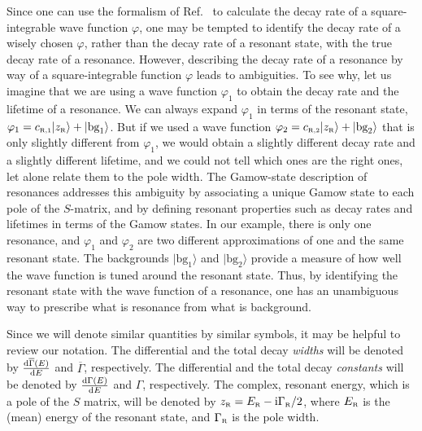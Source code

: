 \documentclass[12pt]{article}
\newcommand{\rmi}{{\rm i}}
\newcommand{\rmd}{{\rm d}}
\newcommand{\zr}{z_{\text{\tiny R}}}
\newcommand{\gr}{\Gamma _{\text{\tiny R}}}
\newcommand{\er}{E_{\text{\tiny R}}}
\newcommand{\Co}{c_{\text{\tiny R,1}}}
\newcommand{\Ct}{c_{\text{\tiny R,2}}}
\begin{document}
Since one can use the formalism of Ref.~\cite{NPA15} to calculate 
the decay rate of a square-integrable wave function $\varphi$, one may be 
tempted to identify the decay rate of a wisely chosen $\varphi$, rather than
the decay rate of a resonant state, with the true decay 
rate of a resonance. However, describing 
the decay rate of a resonance by way of a square-integrable function
$\varphi$ leads to ambiguities. To see why, let us imagine that we are using
a wave function $\varphi _1$ to obtain the decay rate and the
lifetime of a resonance. We
can always expand $\varphi _1$ in terms of the resonant state,
$\varphi _1= \Co |{\zr} \rangle + |\text{bg}_1\rangle$. But if we used 
a wave function $\varphi _2= \Ct |\zr \rangle + |\text{bg}_2\rangle$ that is 
only slightly different from $\varphi _1$, we would obtain a slightly different
decay rate and a slightly different lifetime, and we could not tell which ones 
are the right ones, let alone relate them to the pole width. The Gamow-state 
description of resonances addresses
this ambiguity by associating a unique Gamow state to each pole of the
$S$-matrix, and by defining resonant properties such as decay rates and
lifetimes in terms of the Gamow states. In our example, there is only one 
resonance, and $\varphi _1$
and $\varphi _2$ are two different approximations of one and the same 
resonant state. The backgrounds $|\text{bg}_1\rangle$ and 
$|\text{bg}_2\rangle$ provide a measure of how well the
wave function is tuned around the resonant state. Thus, by identifying the 
resonant state with the wave function of a resonance, one has an 
unambiguous way to prescribe what is resonance from what is background.

Since we will denote similar quantities by similar symbols, it may be 
helpful to review our notation. The differential and the
total decay
{\it widths} will be denoted by $\frac{\rmd \overline{\Gamma} (E)}{\rmd E}$
and $\overline{\Gamma}$, respectively. The
differential and the total decay {\it constants} will be
denoted by $\frac{\rmd \Gamma (E)}{\rmd E}$ and $\Gamma$, respectively. The
complex, resonant energy, which is a pole of the $S$ matrix, will be 
denoted by $\zr = \er -\rmi \gr /2$, where
$\er$ is the (mean) energy of the resonant state, and $\gr$ is the
pole width. 
\end{document}
